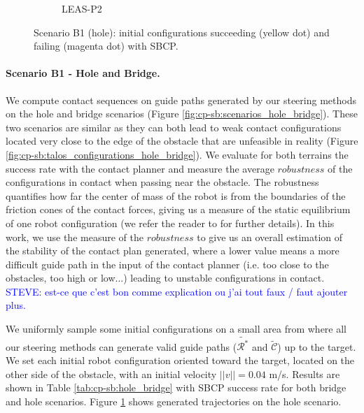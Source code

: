 \begin{figure}[t]
\begin{subfigure}[t]{0.48\linewidth}
        \caption{LEAS-P2}
    \end{subfigure}
    \caption{Scenario B1 (hole): initial configurations succeeding (yellow dot) and failing (magenta dot) with SBCP.}
    \label{fig:cp-sb:trajectories_hole}
\end{figure}

\paragraph{Scenario B1 - Hole and Bridge.} 
We compute contact sequences on guide paths generated by our steering methods on the hole and bridge scenarios (Figure \ref{fig:cp-sb:scenarios_hole_bridge}). 
These two scenarios are similar as they can both lead to weak contact configurations located very close to the edge of the obstacle that are unfeasible in reality (Figure \ref{fig:cp-sb:talos_configurations_hole_bridge}).
We evaluate for both terrains the success rate with the contact planner and measure the average $robustness$ of the configurations in contact when passing near the obstacle.
The robustness quantifies how far the center of mass of the robot is from the boundaries of the friction cones of the contact forces, giving us a measure of the static equilibrium of one robot configuration (we refer the reader to \cite{AcyclicCP} for further details).
In this work, we use the measure of the $robustness$ to give us an overall estimation of the stability of the contact plan generated, where a lower value means a more difficult guide path in the input of the contact planner (i.e. too close to the obstacles, too high or low...) leading to unstable configurations in contact.
\textcolor{blue}{STEVE: est-ce que c'est bon comme explication ou j'ai tout faux / faut ajouter plus.}

 


We uniformly sample some initial configurations on a small area from where all our steering methods can generate valid guide paths ($\tilde{\mathcal{R}^*}$ and $\tilde{\mathcal{C}}$) up to the target.
We set each initial robot configuration oriented toward the target, located on the other side of the obstacle, with an initial velocity $||v||=0.04$ m/s.
Results are shown in Table \ref{tab:cp-sb:hole_bridge} with SBCP success rate for both bridge and hole scenarios. Figure \ref{fig:cp-sb:trajectories_hole} shows generated trajectories on the hole scenario.


